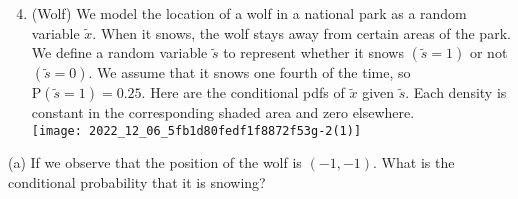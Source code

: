 \documentclass[10pt]{article}
\begin{document}
\begin{enumerate}
  \setcounter{enumi}{3}
  \item (Wolf) We model the location of a wolf in a national park as a random variable $\tilde{x}$. When it snows, the wolf stays away from certain areas of the park. We define a random variable $\tilde{s}$ to represent whether it snows $(\tilde{s}=1)$ or not $(\tilde{s}=0)$. We assume that it snows one fourth of the time, so $\mathrm{P}(\tilde{s}=1)=0.25$. Here are the conditional pdfs of $\tilde{x}$ given $\tilde{s}$. Each density is constant in the corresponding shaded area and zero elsewhere.\\
\texttt{[image: 2022\_12\_06\_5fb1d80fedf1f8872f53g-2(1)]}
\end{enumerate}

(a) If we observe that the position of the wolf is $(-1,-1)$. What is the conditional probability that it is snowing?
\end{document}
